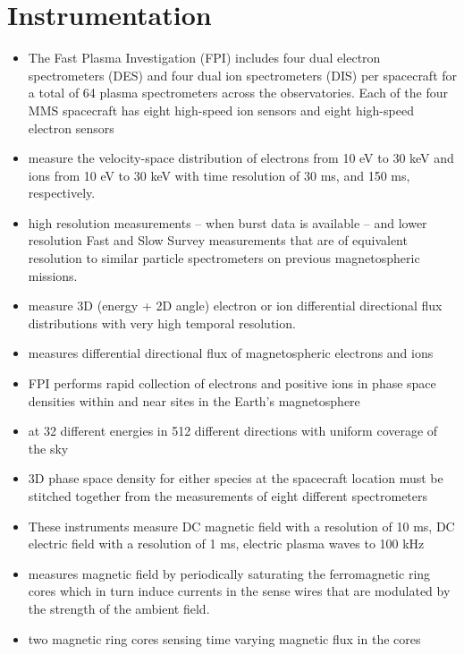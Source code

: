 

\section{Instrumentation}
\begin{itemize}
    \item The Fast Plasma Investigation (FPI) includes four dual electron spectrometers (DES) and four dual ion spectrometers (DIS) per spacecraft for a total of 64 plasma spectrometers across the observatories. Each of the four MMS spacecraft has eight high-speed ion sensors and eight high-speed electron sensors
    \item measure the velocity-space distribution of electrons from 10 eV to 30 keV and ions from 10 eV to 30 keV with time resolution of 30 ms, and 150 ms, respectively.
    \item high resolution measurements – when burst data is available – and lower resolution Fast and Slow Survey measurements that are of equivalent resolution to similar particle spectrometers on previous magnetospheric missions.
    \item measure 3D (energy + 2D angle) electron or ion differential directional flux distributions with very high temporal resolution.
    \item measures differential directional flux of magnetospheric electrons and ions
    \item FPI performs rapid collection of electrons and positive ions in phase space densities within and near sites in the Earth’s magnetosphere
    \item at 32 different energies in 512 different directions with uniform coverage of the sky
    \item 3D phase space density for either species at the spacecraft location must be stitched together from the measurements of eight different spectrometers
\end{itemize}

\begin{itemize}
    \item These instruments measure DC magnetic field with a resolution of 10 ms, DC electric field with a resolution of 1 ms, electric plasma waves to 100 kHz
    \item measures magnetic field by periodically saturating the ferromagnetic ring cores which in turn induce currents in the sense wires that are modulated by the strength of the ambient field.
    \item two magnetic ring cores sensing time varying magnetic flux in the cores
\end{itemize}


